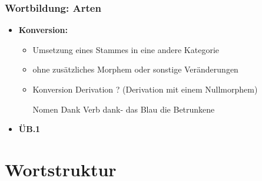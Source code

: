 \begin{frame}
\frametitle{Wortbildung: Arten}

\begin{itemize}
	\item \textbf{Konversion:}
	
	\begin{itemize}
		\item Umsetzung eines Stammes in eine andere Kategorie
		\item ohne zusätzliches Morphem oder sonstige Veränderungen
		\item Konversion \ras Derivation ? (Derivation mit einem Nullmorphem)
		
		\eal 
			\ex Nomen Dank \vs Verb dank-
			\ex das Blau
			\ex die Betrunkene
		\zl
			 
	\end{itemize}
	
	\item[] \textbf{ÜB.1}
\end{itemize}


\end{frame}


\section{Wortstruktur}


